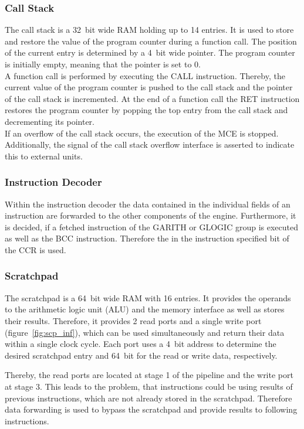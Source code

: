 \subsubsection{Call Stack}

The call stack is a 32~bit wide RAM holding up to 14 entries.
It is used to store and restore the value of the program counter during a function call.
The position of the current entry is determined by a 4~bit wide pointer.
The program counter is initially empty, meaning that the pointer is set to 0.\\
A function call is performed by executing the CALL instruction.
Thereby, the current value of the program counter is pushed to the call stack and the pointer of the call stack is incremented.
At the end of a function call the RET instruction restores the program counter by popping the top entry from the call stack and decrementing its pointer.\\
If an overflow of the call stack occurs, the execution of the MCE is stopped.
Additionally, the signal of the call stack overflow interface is asserted to indicate this to external units.

\subsubsection{Instruction Decoder}

Within the instruction decoder the data contained in the individual fields of an instruction are forwarded to the other components of the engine.
Furthermore, it is decided, if a fetched instruction of the GARITH or GLOGIC group is executed as well as the BCC instruction.
Therefore the in the instruction specified bit of the CCR is used.

\subsubsection{Scratchpad}

The scratchpad is a 64~bit wide RAM with 16 entries.
It provides the operands to the arithmetic logic unit (ALU) and the memory interface as well as stores their results.
Therefore, it provides 2 read ports and a single write port (figure~\ref{fig:scp_inf}), which can be used simultaneously and return their data within a single clock cycle.
Each port uses a 4~bit address to determine the desired scratchpad entry and 64~bit for the read or write data, respectively.


Thereby, the read ports are located at stage 1 of the pipeline and the write port at stage 3.
This leads to the problem, that instructions could be using results of previous instructions, which are not already stored in the scratchpad.
Therefore data forwarding is used to bypass the scratchpad and provide results to following instructions.

